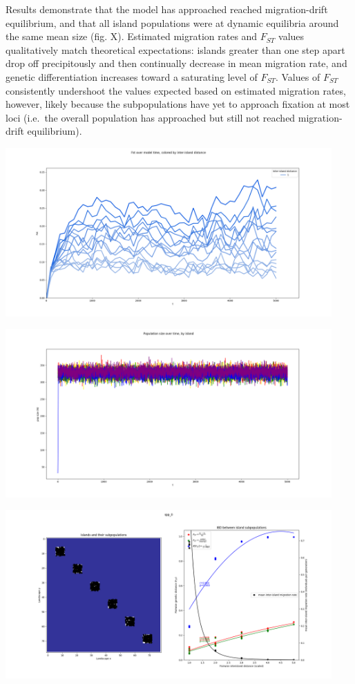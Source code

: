 ﻿\documentclass{article}
\begin{document}
Results demonstrate that the model has approached reached migration-drift equilibrium,
and that all island populations were at dynamic equilibria around the
same mean size (fig. X). Estimated migration rates and $F_{ST}$ values qualitatively
match theoretical expectations: islands greater than one step apart drop off 
precipitously and then continually decrease in mean migration rate,
and genetic differentiation increases toward a saturating level of $F_{ST}$.
Values of $F_{ST}$ consistently undershoot the values expected based on estimated
migration rates, however, likely because the subpopulations have yet to approach fixation
at most loci (i.e.\ the overall population has approached but still not reached
migration-drift equilibrium).

\includegraphics[width=125mm]{./img/validation/stepping_stone/Fst_over_time_vs_interisland_dist.png}

\includegraphics[width=125mm]{./img/validation/stepping_stone/pop_size_over_time.png}

\includegraphics[width=125mm]{./img/validation/stepping_stone/pop_plot_and_Fst_and_mig_rate_plot.png}
\end{document}
